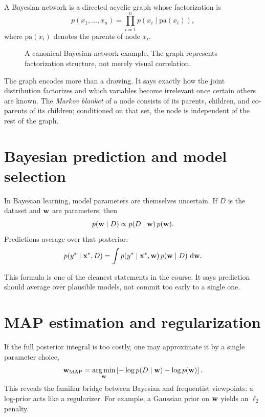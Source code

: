 A Bayesian network is a directed acyclic graph whose factorization is
\[
  p(x_1,\dots,x_n)
  =
  \prod_{i=1}^{n} p(x_i \mid \mathrm{pa}(x_i)),
\]
where $\mathrm{pa}(x_i)$ denotes the parents of node $x_i$.

\begin{figure}[t]
\centering
{}
\caption{A canonical Bayesian-network example. The graph represents factorization structure, not merely visual correlation.}
\end{figure}

The graph encodes more than a drawing. It says exactly how the joint distribution factorizes and which variables become irrelevant once certain others are known. The \emph{Markov blanket} of a node consists of its parents, children, and co-parents of its children; conditioned on that set, the node is independent of the rest of the graph.

\section{Bayesian prediction and model selection}

In Bayesian learning, model parameters are themselves uncertain. If $D$ is the dataset and $\mathbf{w}$ are parameters, then
\[
  p(\mathbf{w} \mid D)
  \propto
  p(D \mid \mathbf{w})\, p(\mathbf{w}).
\]
Predictions average over that posterior:
\[
  p(y^\ast \mid \mathbf{x}^\ast, D)
  =
  \int p(y^\ast \mid \mathbf{x}^\ast, \mathbf{w})\, p(\mathbf{w} \mid D)\,\mathop{}\!\mathrm{d} \mathbf{w}.
\]

This formula is one of the cleanest statements in the course. It says prediction should average over plausible models, not commit too early to a single one.

\section{MAP estimation and regularization}

If the full posterior integral is too costly, one may approximate it by a single parameter choice,
\[
  \mathbf{w}_{\mathrm{MAP}}
  =
  \operatorname*{arg\,min}_{\mathbf{w}}
  \left[
    -\log p(D \mid \mathbf{w}) - \log p(\mathbf{w})
  \right].
\]
This reveals the familiar bridge between Bayesian and frequentist viewpoints: a log-prior acts like a regularizer. For example, a Gaussian prior on $\mathbf{w}$ yields an $\ell_2$ penalty.


